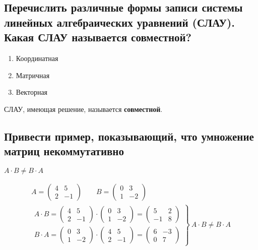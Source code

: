 \subsection{Перечислить различные формы записи системы линейных алгебраических уравнений (СЛАУ). Какая СЛАУ называется совместной?}
\begin{mdframed}[style=Teal,frametitleaboveskip=8pt,  frametitle={Формы записи СЛАУ:}]
	\begin{enumerate}
		\item Координатная
		\item Матричная
		\item Векторная
	\end{enumerate}
\end{mdframed}
\begin{definition*}
	СЛАУ, имеющая решение, называется \textbf{совместной}.
\end{definition*}

\subsection{Привести пример, показывающий, что умножение матриц некоммутативно}
\begin{center} $\boxed{A \cdot B \ne B\cdot A}$ \end{center}
\begin{eg}
	\begin{gather*}
	A = \begin{pmatrix}
	4 & 5\\
	2 & -1
	\end{pmatrix} \qquad B = \begin{pmatrix}
	0 & 3\\
	1 & -2
	\end{pmatrix} \\[1ex]
	\left.
	\begin{aligned}
	A \cdot B = \begin{pmatrix}
	4 & 5\\
	2 & -1
	\end{pmatrix} \cdot\begin{pmatrix}
	0 & 3\\
	1 & -2
	\end{pmatrix} = \begin{pmatrix} 5 & 2 \\ -1 & 8 \end{pmatrix}\\
	B\cdot A = \begin{pmatrix}
	0 & 3\\
	1 & -2
	\end{pmatrix} \cdot \begin{pmatrix}
	4 & 5 \\
	2 & -1
	\end{pmatrix} = \begin{pmatrix} 6 & -3 \\ 0 & 7 \end{pmatrix}
	\end{aligned} \right\}\ A\cdot B \ne B\cdot A
	\end{gather*}
\end{eg}

